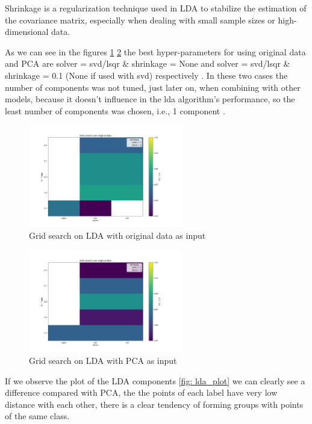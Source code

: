 \documentclass[12pt,a4paper,twocolumn]{article}
\begin{document}
\par Shrinkage is a regularization technique used in LDA to stabilize the estimation of the covariance matrix, especially when dealing with small sample sizes or high-dimensional data.
\break

\par As we can see in the figures \ref{fig: lda_grid} \ref{fig: lda_grid2} the best hyper-parameters for using original data and PCA are solver = svd/lsqr \& shrinkage = None and solver = svd/lsqr \& shrinkage = 0.1 (None if used with svd) respectively . In these two cases the number of components was not tuned, just later on, when combining with other models, because it doesn't influence in the lda algorithm's performance, so the least number of components was chosen, i.e., 1 component .

\begin{figure}[H]
\centering
\includegraphics[width=0.6\textwidth]{images2/grid_lda1.png}
\caption{\label{fig: lda_grid} Grid search on LDA with original data as input}
\end{figure}

\begin{figure}[H]
\centering
\includegraphics[width=0.6\textwidth]{images2/grid_lda_pca.png}
\caption{\label{fig: lda_grid2} Grid search on LDA with PCA as input}
\end{figure}
 \par If we observe the plot of the LDA components
 \ref{fig: lda_plot} we can clearly see a difference compared with PCA, the the points of each label have very low distance with each other, there is a clear tendency of forming groups with points of the same class. 
\end{document}
